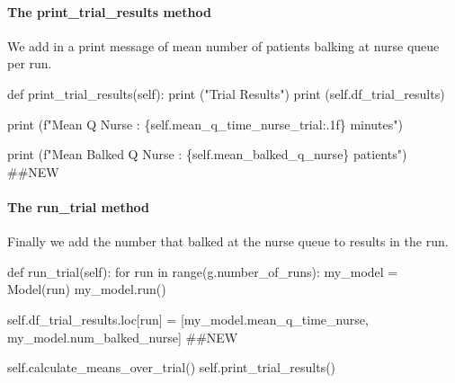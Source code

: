 \documentclass[
  letterpaper,
  DIV=11,
  numbers=noendperiod]{scrreprt}
\let\oldparagraph\paragraph
\renewcommand{\paragraph}[1]{\oldparagraph{#1}\mbox{}}
\newenvironment{Shaded}{}{}
\newcommand{\BuiltInTok}[1]{\textcolor[rgb]{0.84,0.23,0.29}{#1}}
\newcommand{\CommentTok}[1]{\textcolor[rgb]{0.42,0.45,0.49}{#1}}
\newcommand{\ControlFlowTok}[1]{\textcolor[rgb]{0.84,0.23,0.29}{#1}}
\newcommand{\KeywordTok}[1]{\textcolor[rgb]{0.84,0.23,0.29}{#1}}
\newcommand{\NormalTok}[1]{\textcolor[rgb]{0.14,0.16,0.18}{#1}}
\newcommand{\OperatorTok}[1]{\textcolor[rgb]{0.14,0.16,0.18}{#1}}
\newcommand{\SpecialCharTok}[1]{\textcolor[rgb]{0.00,0.36,0.77}{#1}}
\newcommand{\SpecialStringTok}[1]{\textcolor[rgb]{0.01,0.18,0.38}{#1}}
\newcommand{\StringTok}[1]{\textcolor[rgb]{0.01,0.18,0.38}{#1}}
\newcommand{\VariableTok}[1]{\textcolor[rgb]{0.89,0.38,0.04}{#1}}
\begin{document}
\paragraph{The print\_trial\_results
method}\label{the-print_trial_results-method-1}

We add in a print message of mean number of patients balking at nurse
queue per run.

\begin{Shaded}
\begin{Highlighting}[]
\KeywordTok{def}\NormalTok{ print\_trial\_results(}\VariableTok{self}\NormalTok{):}
    \BuiltInTok{print}\NormalTok{ (}\StringTok{"Trial Results"}\NormalTok{)}
    \BuiltInTok{print}\NormalTok{ (}\VariableTok{self}\NormalTok{.df\_trial\_results)}

    \BuiltInTok{print}\NormalTok{ (}\SpecialStringTok{f"Mean Q Nurse : }\SpecialCharTok{\{}\VariableTok{self}\SpecialCharTok{.}\NormalTok{mean\_q\_time\_nurse\_trial}\SpecialCharTok{:.1f\}}\SpecialStringTok{ minutes"}\NormalTok{)}

    \BuiltInTok{print}\NormalTok{ (}\SpecialStringTok{f"Mean Balked Q Nurse : }\SpecialCharTok{\{}\VariableTok{self}\SpecialCharTok{.}\NormalTok{mean\_balked\_q\_nurse}\SpecialCharTok{\}}\SpecialStringTok{ patients"}\NormalTok{) }\CommentTok{\#\#NEW}
\end{Highlighting}
\end{Shaded}

\paragraph{The run\_trial method}\label{the-run_trial-method-2}

Finally we add the number that balked at the nurse queue to results in
the run.

\begin{Shaded}
\begin{Highlighting}[]
\KeywordTok{def}\NormalTok{ run\_trial(}\VariableTok{self}\NormalTok{):}
    \ControlFlowTok{for}\NormalTok{ run }\KeywordTok{in} \BuiltInTok{range}\NormalTok{(g.number\_of\_runs):}
\NormalTok{        my\_model }\OperatorTok{=}\NormalTok{ Model(run)}
\NormalTok{        my\_model.run()}

        \VariableTok{self}\NormalTok{.df\_trial\_results.loc[run] }\OperatorTok{=}\NormalTok{ [my\_model.mean\_q\_time\_nurse,}
\NormalTok{                                            my\_model.num\_balked\_nurse] }\CommentTok{\#\#NEW}

    \VariableTok{self}\NormalTok{.calculate\_means\_over\_trial()}
    \VariableTok{self}\NormalTok{.print\_trial\_results()}
\end{Highlighting}
\end{Shaded}
\end{document}
